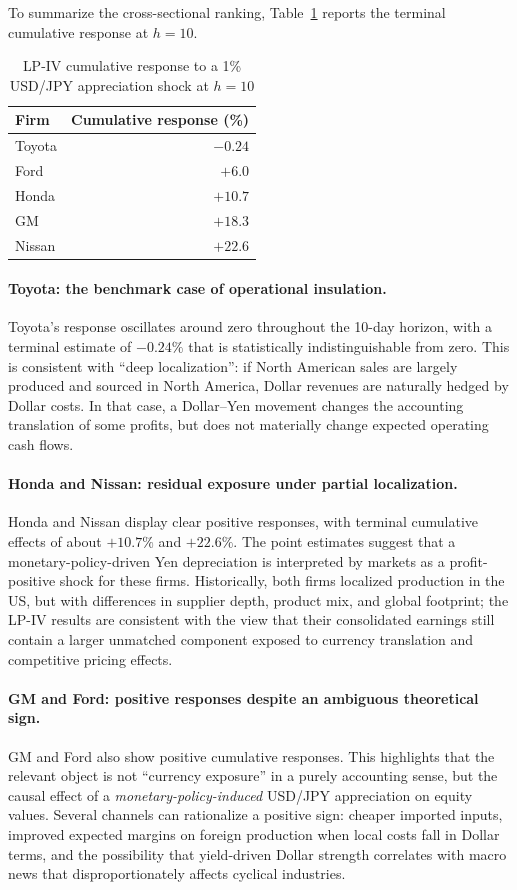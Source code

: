 \documentclass[12pt,a4paper]{article}
\begin{document}
To summarize the cross-sectional ranking, Table~\ref{tab:lpivsummary} reports the terminal cumulative response at $h=10$.

\begin{table}[H]
\centering
\caption{LP-IV cumulative response to a 1\% USD/JPY appreciation shock at $h=10$}
\label{tab:lpivsummary}
\begin{tabular}{lr}
\toprule
Firm & Cumulative response (\%) \\
\midrule
Toyota & $-0.24$ \\
Ford & $+6.0$ \\
Honda & $+10.7$ \\
GM & $+18.3$ \\
Nissan & $+22.6$ \\
\bottomrule
\end{tabular}
\end{table}

\paragraph{Toyota: the benchmark case of operational insulation.}
Toyota's response oscillates around zero throughout the 10-day horizon, with a terminal estimate of $-0.24\%$ that is statistically indistinguishable from zero. This is consistent with ``deep localization'': if North American sales are largely produced and sourced in North America, Dollar revenues are naturally hedged by Dollar costs. In that case, a Dollar--Yen movement changes the accounting translation of some profits, but does not materially change expected operating cash flows.

\paragraph{Honda and Nissan: residual exposure under partial localization.}
Honda and Nissan display clear positive responses, with terminal cumulative effects of about $+10.7\%$ and $+22.6\%$. The point estimates suggest that a monetary-policy-driven Yen depreciation is interpreted by markets as a profit-positive shock for these firms. Historically, both firms localized production in the US, but with differences in supplier depth, product mix, and global footprint; the LP-IV results are consistent with the view that their consolidated earnings still contain a larger unmatched component exposed to currency translation and competitive pricing effects.

\paragraph{GM and Ford: positive responses despite an ambiguous theoretical sign.}
GM and Ford also show positive cumulative responses. This highlights that the relevant object is not ``currency exposure'' in a purely accounting sense, but the causal effect of a \emph{monetary-policy-induced} USD/JPY appreciation on equity values. Several channels can rationalize a positive sign: cheaper imported inputs, improved expected margins on foreign production when local costs fall in Dollar terms, and the possibility that yield-driven Dollar strength correlates with macro news that disproportionately affects cyclical industries.
\end{document}
